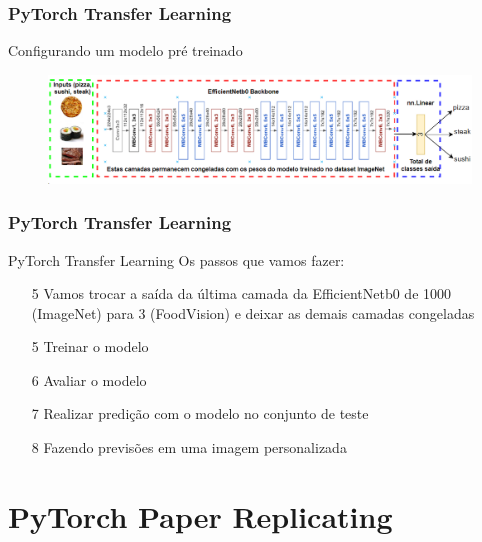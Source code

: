 \documentclass{beamer}
\begin{document}
\begin{frame}
	\frametitle{PyTorch Transfer Learning}
	\begin{block}{Configurando um modelo pré treinado}
	\begin{figure}
		\centering
		\includegraphics[width=1\linewidth]{figures/transfer_learning01}
	\end{figure}
		
	\end{block}
\end{frame} 

\begin{frame}
	\frametitle{PyTorch Transfer Learning}
	\begin{block}{PyTorch Transfer Learning}
		Os passos que vamos fazer:
		\begin{itemize}
			\item[5] Vamos trocar a saída da última camada da EfficientNetb0 de 1000 (ImageNet) para 3 (FoodVision) e deixar as demais camadas congeladas
			\item[5] Treinar o modelo
			\item[6] Avaliar o modelo
			\item[7] Realizar predição com o modelo no conjunto de teste
			\item[8] Fazendo previsões em uma imagem personalizada
		\end{itemize}
	\end{block}
\end{frame} 

\section{PyTorch Paper Replicating}
\end{document}
